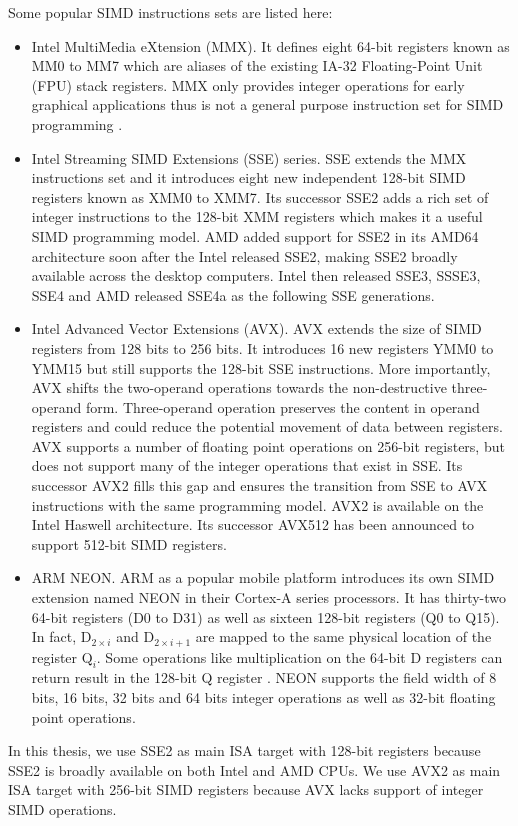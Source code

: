 Some popular SIMD instructions sets are listed here:
\begin{itemize}
  \item Intel MultiMedia eXtension (MMX). It defines eight 64-bit registers known as MM0 to MM7 which are aliases of the existing IA-32 Floating-Point Unit (FPU) stack registers. MMX only provides integer operations for early graphical applications thus is not a general purpose instruction set for SIMD programming \cite{hua_idisa}.

  \item Intel Streaming SIMD Extensions (SSE) series. SSE extends the MMX instructions set and it introduces eight new independent 128-bit SIMD registers known as XMM0 to XMM7. Its successor SSE2 adds a rich set of integer instructions to the 128-bit XMM registers which makes it a useful SIMD programming model. AMD added support for SSE2 in its AMD64 architecture soon after the Intel released SSE2, making SSE2 broadly available across the desktop computers. Intel then released SSE3, SSSE3, SSE4 and AMD released SSE4a as the following SSE generations.

  \item Intel Advanced Vector Extensions (AVX). AVX extends the size of SIMD registers from 128 bits to 256 bits. It introduces 16 new registers YMM0 to YMM15 but still supports the 128-bit SSE instructions. More importantly, AVX shifts the two-operand operations towards the non-destructive three-operand form. Three-operand operation preserves the content in operand registers and could reduce the potential movement of data between registers. AVX supports a number of floating point operations on 256-bit registers, but does not support many of the integer operations that exist in SSE\@. Its successor AVX2 fills this gap and ensures the transition from SSE to AVX instructions with the same programming model. AVX2 is available on the Intel Haswell architecture. Its successor AVX512 has been announced to support 512-bit SIMD registers.

  \item ARM NEON\@. ARM as a popular mobile platform introduces its own SIMD extension named NEON in their Cortex-A series processors. It has thirty-two 64-bit registers (D0 to D31) as well as sixteen 128-bit registers (Q0 to Q15). In fact, $\text{D}_{2 \times i}$ and $\text{D}_{2 \times i + 1}$ are mapped to the same physical location of the register $\text{Q}_i$. Some operations like multiplication on the 64-bit D registers can return result in the 128-bit Q register \cite{hua_idisa}. NEON supports the field width of 8 bits, 16 bits, 32 bits and 64 bits integer operations as well as 32-bit floating point operations.
\end{itemize}
In this thesis, we use SSE2 as main ISA target with 128-bit registers because SSE2 is broadly available on both Intel and AMD CPUs. We use AVX2 as main ISA target with 256-bit SIMD registers because AVX lacks support of integer SIMD operations.


